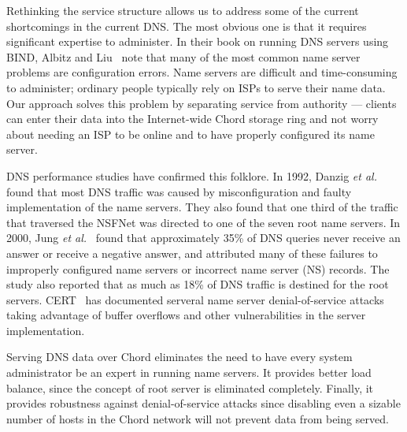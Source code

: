 Rethinking the service structure allows us to address
some of the current shortcomings in the current DNS.
The most obvious one is that it requires 
significant expertise to administer.
In their book on running DNS servers using BIND,
Albitz and Liu~\cite{dns-bind} note that many of the most
common name server problems are configuration errors.
Name servers are difficult and time-consuming to administer;
ordinary people typically rely on ISPs to serve their name data.
Our approach solves this problem by separating service from
authority --- clients can enter their data into the Internet-wide
Chord storage ring and not worry about needing an ISP to be
online and to have properly configured its name server.

DNS performance studies have confirmed this folklore.
In 1992, Danzig {\it et al.}~\cite{dnsroot:sigcomm92} found that
most DNS traffic was caused by misconfiguration and faulty implementation
of the name servers.
They also found that one third of the 
traffic that traversed the NSFNet was directed to one of 
the seven root name servers. 
In 2000, Jung {\it et al.}~\cite{dnscache:sigcommimw01}
found that approximately 35\% of DNS queries never receive
an answer or receive a negative answer, and attributed
many of these failures to 
improperly configured name servers or incorrect name server (NS) records.
The study also reported that as much as 18\% of DNS traffic is destined
for the root servers. 
CERT~\cite{cert} has documented serveral name server
denial-of-service attacks taking advantage of buffer overflows
and other vulnerabilities in the server implementation.

Serving DNS data over Chord eliminates the need to have
every system administrator be an expert in running name servers.
It provides better load balance, since the concept of root server
is eliminated completely.
Finally, it provides robustness against denial-of-service attacks
since disabling even a sizable number of hosts in the 
Chord network will not prevent data from being served.
